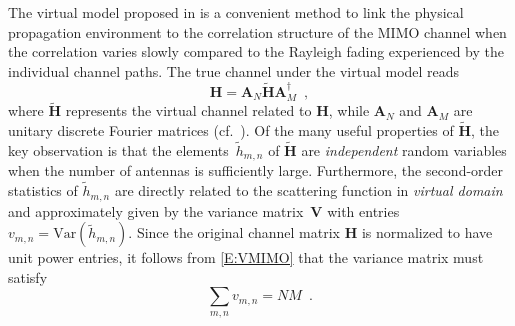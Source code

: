 \documentclass[10pt,conference]{IEEEtran}
\begin{document}
The virtual model proposed in \cite{MIMO:Correlated:Sayeed02:Deconstructing, MIMO:Veeravalli2005:CorrelatedMIMO:Variance} is a convenient method to link the physical propagation environment to the correlation structure of the MIMO channel when the correlation varies slowly compared to the Rayleigh fading experienced by the individual channel paths.  The true channel under the virtual model reads
\begin{equation}
\label{E:VMIMO}
\mathbf{H}=\mathbf{A}_N \widetilde{ \mathbf{H} }  \mathbf{A}^{\dag}_M   \enspace ,
\end{equation}
where $\widetilde{ \mathbf{H} } $ represents the virtual channel related to $\mathbf{H}$, while $\mathbf{A}_N$ and $\mathbf{A}_M$ are unitary discrete Fourier matrices
(cf.\ \cite{MIMO:Correlated:Sayeed02:Deconstructing,MIMO:Veeravalli2005:CorrelatedMIMO:Variance}).
Of the many useful properties of $\widetilde{ \mathbf{H} } $, the key observation is that the elements~$\widetilde{h}_{m,n}$ of $\widetilde{ \mathbf{H} } $ are \emph{independent} random variables when the number of antennas is sufficiently large.
Furthermore, the second-order statistics of $\widetilde{h}_{m,n}$ are directly related to the scattering function in \emph{virtual domain} and approximately given by the variance matrix~$\mathbf{V}$ with entries $v_{m,n}=\mathrm{Var}(\widetilde{h}_{m,n})$.
Since the original channel matrix $\mathbf{H}$ is normalized to have unit power entries, it follows from \eqref{E:VMIMO} that the variance matrix must satisfy
\begin{equation}\label{E:normalization_v}
\sum_{m,n}v_{m,n}=NM \enspace.
\end{equation}
\end{document}
